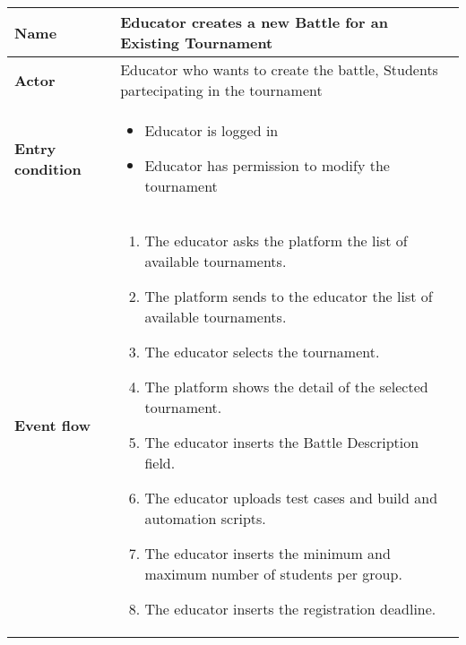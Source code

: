\begin{enumerate}[label=\textbf{UC\arabic*}:,ref=UC\arabic*,leftmargin=1.3cm]
{            \begin{table}[H]
                  \centering
                  \begin{tabular}{|l|p{11.9cm}|}
                        \hline
                        \textbf{Name}            & Educator creates a new Battle for an Existing Tournament                                                                                                    \\\hline
                        \textbf{Actor}           & Educator who wants to create the battle, Students partecipating in the tournament                                                                           \\\hline
                        \textbf{Entry condition} &
                        \begin{itemize}
                              \item Educator is logged in
                              \item Educator has permission to modify the tournament
                        \end{itemize}                                                                                                                                  \\\hline
                        \textbf{Event flow}      &
                        \begin{enumerate}[label=\arabic*.]
                              \item The educator asks the platform the list of available tournaments.
                              \item The platform sends to the educator the list of available tournaments.
                              \item The educator selects the tournament.
                              \item The platform shows the detail of the selected tournament.
                              \item The educator inserts the Battle Description field.
                              \item The educator uploads test cases and build and automation scripts.
                              \item The educator inserts the minimum and maximum number of students per group.
                              \item The educator inserts the registration deadline.

\end{enumerate}
\end{tabular}
\end{table}}
\end{enumerate}
